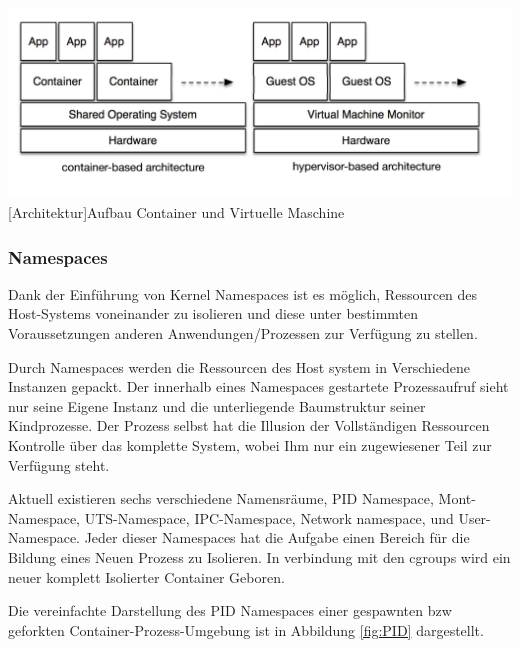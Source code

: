 \vspace{1em}
\begin{minipage}{\linewidth}
	\centering
	\includegraphics[width=1\linewidth]{pics/docker2.png}
	[Architektur]{Aufbau Container und Virtuelle Maschine \cite{Xavier2015AClouds}}
	\label{fig:architecture}
\end{minipage}

\subsubsection{Namespaces}
Dank der Einführung von Kernel Namespaces ist es möglich, Ressourcen des Host-Systems voneinander zu isolieren und diese unter bestimmten Voraussetzungen anderen Anwendungen/Prozessen zur Verfügung zu stellen. 

Durch Namespaces werden die Ressourcen des Host system in Verschiedene Instanzen gepackt. Der innerhalb eines Namespaces gestartete Prozessaufruf sieht nur seine Eigene Instanz und die unterliegende Baumstruktur seiner Kindprozesse. Der Prozess selbst hat die Illusion der Vollständigen Ressourcen Kontrolle über das komplette System, wobei Ihm nur ein zugewiesener Teil zur Verfügung steht.

Aktuell existieren sechs verschiedene Namensräume, PID Namespace, Mont-Namespace, UTS-Namespace, IPC-Namespace, Network namespace, und User-Namespace. Jeder dieser Namespaces hat die Aufgabe einen Bereich für die Bildung eines Neuen Prozess zu Isolieren. In verbindung mit den cgroups wird ein neuer komplett Isolierter Container Geboren.

Die vereinfachte Darstellung des PID Namespaces einer gespawnten bzw geforkten Container-Prozess-Umgebung ist in Abbildung \ref{fig:PID} dargestellt. \cite{Liebel2017SkalierbareContainer-Infrastrukturen}

